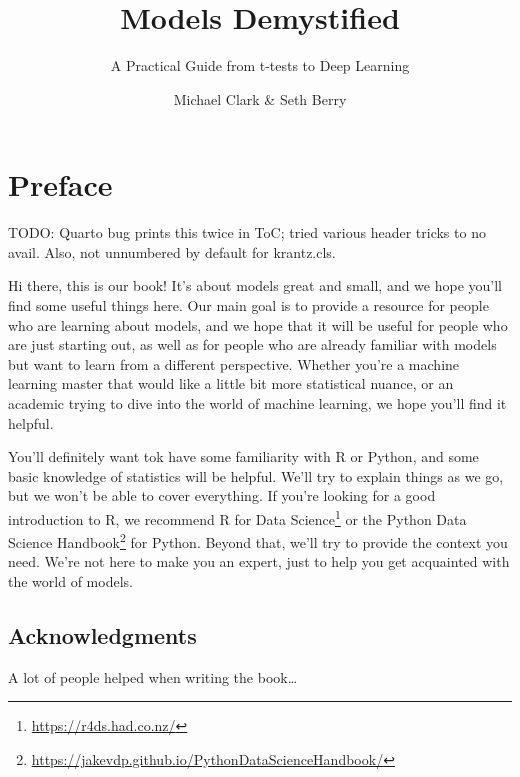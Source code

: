 \documentclass[
  letterpaper,
]{krantz}
\title{Models Demystified}
\subtitle{A Practical Guide from t-tests to Deep Learning}
\author{Michael Clark \& Seth Berry}
\date{}
\renewcommand*\contentsname{Table of contents}
\newcommand\contentsname{Table of contents}
\DeclareRobustCommand{\href}[2]{#2\footnote{\url{#1}}}
\begin{document}
\maketitle


\renewcommand*\contentsname{Contents}
{
\setcounter{tocdepth}{2}
\tableofcontents
}

\chapter*{Preface}\label{preface}


TODO: Quarto bug prints this twice in ToC; tried various header tricks
to no avail. Also, not unnumbered by default for krantz.cls.

Hi there, this is our book! It's about models great and small, and we
hope you'll find some useful things here. Our main goal is to provide a
resource for people who are learning about models, and we hope that it
will be useful for people who are just starting out, as well as for
people who are already familiar with models but want to learn from a
different perspective. Whether you're a machine learning master that
would like a little bit more statistical nuance, or an academic trying
to dive into the world of machine learning, we hope you'll find it
helpful.

You'll definitely want tok have some familiarity with R or Python, and
some basic knowledge of statistics will be helpful. We'll try to explain
things as we go, but we won't be able to cover everything. If you're
looking for a good introduction to R, we recommend
\href{https://r4ds.had.co.nz/}{R for Data Science} or the
\href{https://jakevdp.github.io/PythonDataScienceHandbook/}{Python Data
Science Handbook} for Python. Beyond that, we'll try to provide the
context you need. We're not here to make you an expert, just to help you
get acquainted with the world of models.

\section*{Acknowledgments}\label{acknowledgments}


A lot of people helped when writing the book\ldots{}
\end{document}
